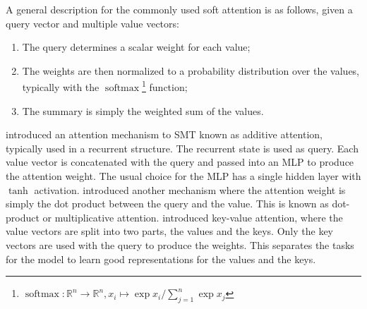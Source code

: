 \documentclass[11pt]{article}
\DeclareMathOperator{\softmax}{softmax}
\begin{document}
A general description for the commonly used soft attention is as follows,
given a query vector and multiple value vectors:

\begin{enumerate}
  \item The query determines a scalar weight for each value;
  \item The weights are then normalized to a probability distribution over the values, typically with
    the \(\softmax\)\footnote{\(\softmax : \mathbb{R}^{n} \to \mathbb{R}^{n},
      x_{i} \mapsto \exp x_{i} / \sum_{j=1}^{n}{\exp x_{j}}\)} function;
  \item The summary is simply the weighted sum of the values.
\end{enumerate}

\textcite{bahdanau2014neural} introduced an attention mechanism to SMT known as additive attention,
typically used in a recurrent structure.
The recurrent state is used as query.
Each value vector is concatenated with the query and passed into an MLP to produce the attention weight.
The usual choice for the MLP has a single hidden layer with \(\tanh\) activation.
\textcite{luong2015effective} introduced another mechanism where the attention weight is simply
the dot product between the query and the value.
This is known as dot-product or multiplicative attention.
\textcite{daniluk2017frustratingly} introduced key-value attention,
where the value vectors are split into two parts, the values and the keys.
Only the key vectors are used with the query to produce the weights.
This separates the tasks for the model to learn good representations for the values and the keys.
\end{document}
